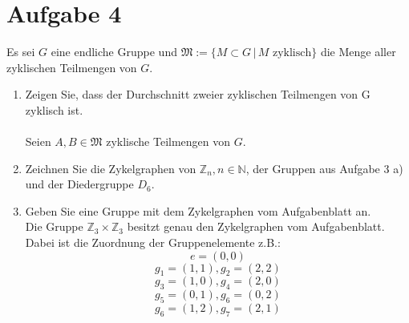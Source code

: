 \documentclass[11pt,a4paper,ngerman]{article}
\newcommand{\N}{\mathbb{N}}
\newcommand{\Z}{\mathbb{Z}}
\begin{document}
\section*{Aufgabe 4}
Es sei $G$ eine endliche Gruppe und $\mathfrak{M} := \{ M \subset G \, | \, M \text{ zyklisch} \}$ die Menge aller zyklischen Teilmengen von $G$.
\begin{enumerate}[\bfseries a)]
\item Zeigen Sie, dass der Durchschnitt zweier zyklischen Teilmengen von G zyklisch ist. \\ \\
Seien $A,B \in \mathfrak{M}$ zyklische Teilmengen von $G$.
\item Zeichnen Sie die Zykelgraphen von $\Z_n, n\in \N$, der Gruppen aus Aufgabe 3 a) und der Diedergruppe $D_6$. \\
\vspace{20cm}
\item Geben Sie eine Gruppe mit dem Zykelgraphen vom Aufgabenblatt an. \\
Die Gruppe $\Z_3 \times \Z_3$ besitzt genau den Zykelgraphen vom Aufgabenblatt. \\
Dabei ist die Zuordnung der Gruppenelemente z.B.:\\
$$ e = (0,0) $$
$$ g_1 = (1,1), g_2 = (2,2) $$
$$ g_3 = (1,0), g_4 = (2,0) $$
$$ g_5 = (0,1), g_6 = (0,2) $$
$$ g_6 = (1,2), g_7 = (2,1) $$ %
\end{enumerate}

\label{LastPage}
\end{document}
